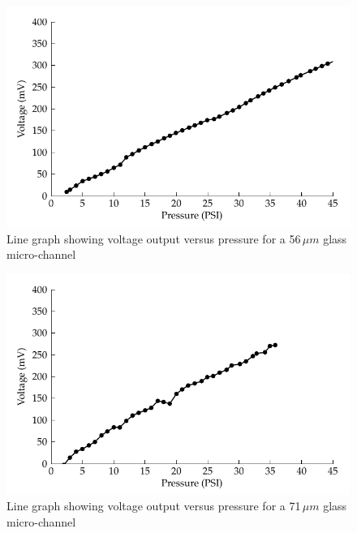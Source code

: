 \begin{figure}
\begin{centering}
\includegraphics{content/appendices/streamingCellMeasurements/graphics/streamingCell_voltVsPress_56um_out}
\par\end{centering}

\protect\caption{Line graph showing voltage output versus pressure for a 56$\,\mu m$
glass micro-channel}
\end{figure}
\begin{figure}
\begin{centering}
\includegraphics{content/appendices/streamingCellMeasurements/graphics/streamingCell_voltVsPress_71um_out}
\par\end{centering}

\protect\caption{Line graph showing voltage output versus pressure for a 71$\,\mu m$
glass micro-channel}
\end{figure}
